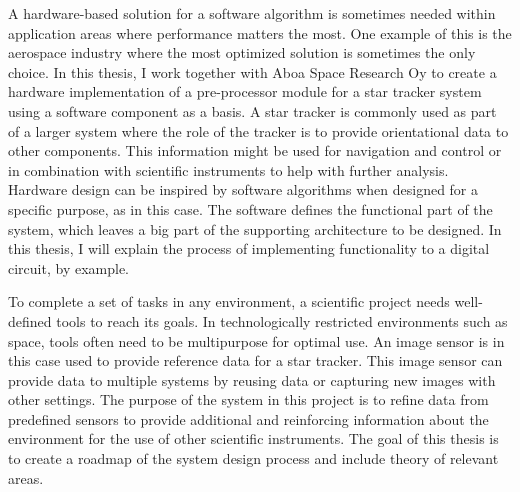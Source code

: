 \documentclass[12pt]{report}
\begin{document}
A hardware-based solution for a software algorithm is sometimes needed within application areas where performance matters the most. One example of this is the aerospace industry where the most optimized solution is sometimes the only choice. In this thesis, I work together with Aboa Space Research Oy to create a hardware implementation of a pre-processor module for a star tracker system using a software component as a basis. A star tracker is commonly used as part of a larger system where the role of the tracker is to provide orientational data to other components. This information might be used for navigation and control or in combination with scientific instruments to help with further analysis.
Hardware design can be inspired by software algorithms when designed for a specific purpose, as in this case. The software defines the functional part of the system, which leaves a big part of the supporting architecture to be designed. In this thesis, I will explain the process of implementing functionality to a digital circuit, by example.



\par

To complete a set of tasks in any environment, a scientific project needs well-defined tools to reach its goals. In technologically restricted environments such as space, tools often need to be multipurpose for optimal use. An image sensor is in this case used to provide reference data for a star tracker. This image sensor can provide data to multiple systems by reusing data or capturing new images with other settings. The purpose of the system in this project is to refine data from predefined sensors to provide additional and reinforcing information about the environment for the use of other scientific instruments. The goal of this thesis is to create a roadmap of the system design process and include theory of relevant areas.
\end{document}

